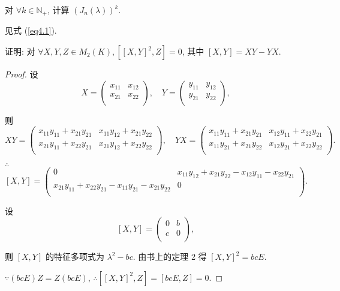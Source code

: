 \documentclass{ctexart}
\begin{document}
\begin{exercise}%
    对 $\forall k\in\mathbb{N}_+$, 计算 $(J_n(\lambda))^k$.
\end{exercise}
\begin{solution}
    见式 (\ref{eq4.1}).
\end{solution}
\begin{exercise}%
    证明: 对 $\forall X,Y,Z\in M_2(K),[[X,Y]^2,Z]=0$, 其中 $[X,Y]=XY-YX$.
\end{exercise}
\begin{proof}
    设
    \[X=\begin{pmatrix}
        x_{11} & x_{12} \\
        x_{21} & x_{22} \\
    \end{pmatrix},\quad Y=\begin{pmatrix}
        y_{11} & y_{12} \\
        y_{21} & y_{22} \\
    \end{pmatrix},\]

    则
    \[XY=\begin{pmatrix}
        x_{11}y_{11}+x_{21}y_{21} & x_{11}y_{12}+x_{21}y_{22} \\
        x_{21}y_{11}+x_{22}y_{21} & x_{21}y_{12}+x_{22}y_{22} \\
    \end{pmatrix},\quad YX=\begin{pmatrix}
        x_{11}y_{11}+x_{21}y_{21} & x_{12}y_{11}+x_{22}y_{21} \\
        x_{11}y_{21}+x_{21}y_{22} & x_{12}y_{21}+x_{22}y_{22} \\
    \end{pmatrix}.\]

    $\therefore$
    \[[X,Y]=\begin{pmatrix}
        0 & x_{11}y_{12}+x_{21}y_{22}-x_{12}y_{11}-x_{22}y_{21} \\
        x_{21}y_{11}+x_{22}y_{21}-x_{11}y_{21}-x_{21}y_{22} & 0 \\
    \end{pmatrix}.\]

    设
    \[[X,Y]=\begin{pmatrix}
        0 & b \\
        c & 0 \\
    \end{pmatrix},\]

    则 $[X,Y]$ 的特征多项式为 $\lambda^2-bc$. 由书上的定理 2 得 $[X,Y]^2=bcE$.

    $\because (bcE)Z=Z(bcE)$, $\therefore[[X,Y]^2,Z]=[bcE,Z]=0$.
\end{proof}
\end{document}
